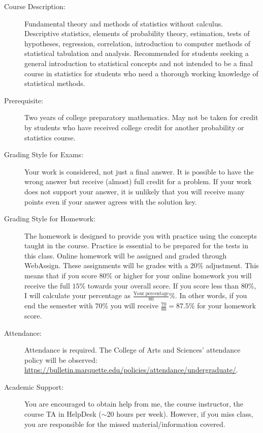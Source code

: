 \documentclass[10pt]{article}
\begin{document}
\begin{description}
\item[Course Description:] Fundamental theory and methods of statistics without calculus. Descriptive statistics, elements of probability theory, estimation, tests of hypotheses, regression, correlation, introduction to computer methods of statistical tabulation and analysis. Recommended for students seeking a general introduction to statistical concepts and not intended to be a final course in statistics for students who need a thorough working knowledge of statistical methods. 

\item[Prerequisite:] Two years of college preparatory mathematics. May not be taken for credit by students who have received college credit for another probability or statistics course.  

\item [Grading Style for Exams:] Your work is considered, not just a final answer. It is possible to have the wrong answer but receive (almost) full credit for a problem. If your work does not support your answer, it is unlikely that you will receive many points even if your answer agrees with the solution key.

\item [Grading Style for Homework:] The homework is designed to provide you with practice using the concepts taught in the course. Practice is essential to be prepared for the tests in this class. Online homework will be assigned and graded through WebAssign. These assignments will be grades with a $20\%$ adjustment. This means that if you score $80\%$ or higher for your online homework you will receive the full $15\%$ towards your overall score. If you score less than $80\%$, I will calculate your percentage as $\frac{\mathrm{Your\ percentage}}{80}\%$. In other words, if you end the semester with $70\%$ you will receive $\frac{70}{80}=87.5\%$ for your homework score.

\item [Attendance:] Attendance is required. The College of Arts and Sciences’ attendance policy will be observed: \url{https://bulletin.marquette.edu/policies/attendance/undergraduate/}.

\item [Academic Support:] You are encouraged to obtain help from me, the course instructor, the course TA in {\color{red} HelpDesk ($\sim$20 hours per week)}. However, if you miss class, you are responsible for the missed material/information covered.\vspace{.1in}


\end{description}
\end{document}

